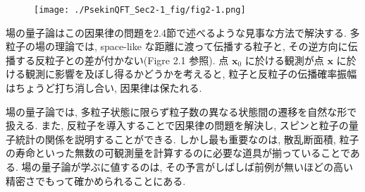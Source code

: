 \documentclass[a4paper,12pt]{article}
\begin{document}
\color{black}

\begin{figure}[H]
  \centering
  \texttt{[image: ./PsekinQFT\_Sec2-1\_fig/fig2-1.png]}
\end{figure}

\noindent 場の量子論はこの因果律の問題を2.4節で述べるような見事な方法で解決する. 多粒子の場の理論では, space-like な距離に渡って伝播する粒子と, その逆方向に伝播する反粒子との差が付かない(Figre 2.1 参照). 点 $\boldsymbol{x}_0$ に於ける観測が点 $\boldsymbol{x}$ に於ける観測に影響を及ぼし得るかどうかを考えると, 粒子と反粒子の伝播確率振幅はちょうど打ち消し合い, 因果律は保たれる.
  
場の量子論では, 多粒子状態に限らず粒子数の異なる状態間の遷移を自然な形で扱える. また, 反粒子を導入することで因果律の問題を解決し, スピンと粒子の量子統計の関係を説明することができる. しかし最も重要なのは, 散乱断面積, 粒子の寿命といった無数の可観測量を計算するのに必要な道具が揃っていることである. 場の量子論が学ぶに値するのは, その予言がしばしば前例が無いほどの高い精密さでもって確かめられることにある.
\end{document}
